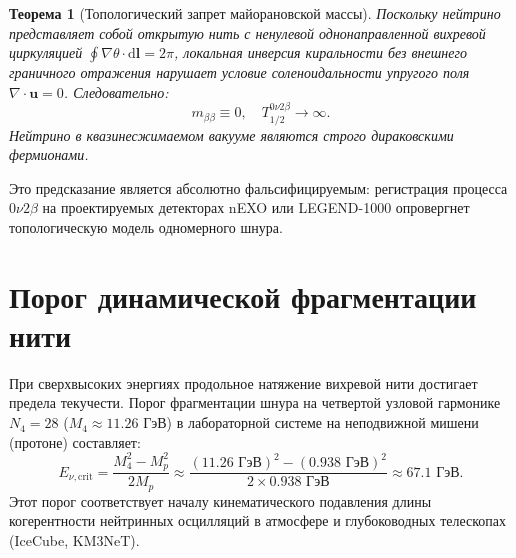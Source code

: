 \documentclass[11pt,a4paper]{article}
\newtheorem{theorem}{Теорема}
\theoremstyle{definition}
\theoremstyle{remark}
\begin{document}
\begin{theorem}[Топологический запрет майорановской массы]
Поскольку нейтрино представляет собой открытую нить с ненулевой однонаправленной вихревой циркуляцией $\oint \nabla \theta \cdot \mathrm{d}\mathbf{l} = 2\pi$, локальная инверсия киральности без внешнего граничного отражения нарушает условие соленоидальности упругого поля $\nabla \cdot \mathbf{u} = 0$. Следовательно:
\begin{equation}
    m_{\beta\beta} \equiv 0, \quad T_{1/2}^{0\nu 2\beta} \to \infty.
\end{equation}
Нейтрино в квазинесжимаемом вакууме являются строго дираковскими фермионами.
\end{theorem}
Это предсказание является абсолютно фальсифицируемым: регистрация процесса $0\nu 2\beta$ на проектируемых детекторах nEXO или LEGEND-1000 опровергнет топологическую модель одномерного шнура.

\section{Порог динамической фрагментации нити}
При сверхвысоких энергиях продольное натяжение вихревой нити достигает предела текучести. Порог фрагментации шнура на четвертой узловой гармонике $N_4 = 28$ ($M_4 \approx 11.26\text{ ГэВ}$) в лабораторной системе на неподвижной мишени (протоне) составляет:
\begin{equation}
    E_{\nu, \mathrm{crit}} = \frac{M_4^2 - M_p^2}{2 M_p} \approx \frac{(11.26\text{ ГэВ})^2 - (0.938\text{ ГэВ})^2}{2 \times 0.938\text{ ГэВ}} \approx \mathbf{67.1\text{ ГэВ}}.
\end{equation}
Этот порог соответствует началу кинематического подавления длины когерентности нейтринных осцилляций в атмосфере и глубоководных телескопах (IceCube, KM3NeT).
\end{document}
